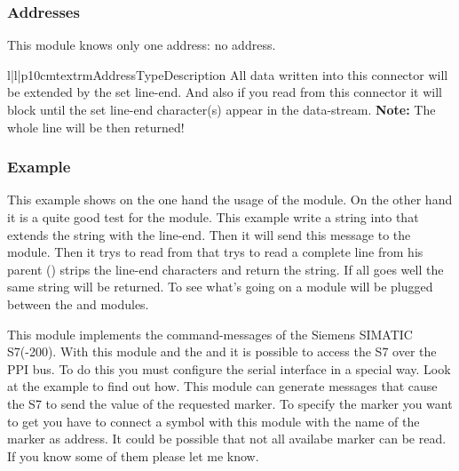 \subsubsection{Addresses}
This module knows only one address: no address.
\begin{tableiii}{l|l|p{10cm}}{textrm}{Address}{Type}{Description}
\lineiii{---}
        {}
        {All data written into this connector will be extended by the set 
         line-end. And also if you read from this connector it will block 
         until the set line-end character(s) appear in the data-stream.
         \textbf{Note:} The whole line will be then returned!}
\end{tableiii}

\subsubsection{Example}
This example shows on the one hand the usage of the  module.
On the other hand it is a quite good test for the  module. 
This example write a string into  that extends the string 
with the line-end. Then it will send this message to the  module.
Then it trys to read from  that trys to read a complete 
line from his parent () strips the line-end characters and
return the string. If all goes well the same string will be returned. To see
what's going on a  module will be plugged between the 
 and  modules.




%
%



%
%



%
%



%
%



%
%
%
This module implements the command-messages of the Siemens SIMATIC S7(-200). 
With this module and the  and 
 it is possible to access the S7 over the 
PPI bus. To do this you must configure the serial interface in a special way. 
Look at the example to find out how. This module can generate messages that 
cause the S7 to send the value of the requested marker. To specify the marker 
you want to get you have to connect a symbol with this module with the name of
the marker as address. It could be possible that not all availabe marker can be
read. If you know some of them please let me know.

